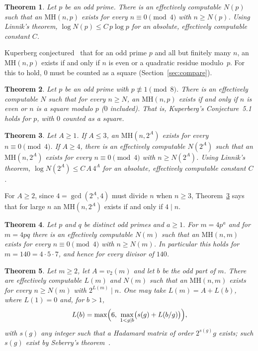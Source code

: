 \documentclass[10pt]{article}
\newtheorem{theorem}{Theorem}
\theoremstyle{remark}
\newcommand{\MH}{\mathrm{MH}}
\begin{document}
\begin{theorem}\label{thm:C}
Let $p$ be an odd prime. There is an effectively computable $N(p)$ such that an $\MH(n,p)$ exists for every $n\equiv0\pmod4$ with $n\ge N(p)$. Using Linnik's theorem, $\log N(p)\le C\,p\log p$ for an absolute, effectively computable constant $C$.
\end{theorem}

Kuperberg conjectured~\cite[Conjecture~5.1]{K} that for an odd prime $p$ and all but finitely many $n$, an $\MH(n,p)$ exists if and only if $n$ is even or a quadratic residue modulo~$p$. For this to hold, $0$ must be counted as a square (Section~\ref{sec:compare}).

\begin{theorem}\label{thm:D}
Let $p$ be an odd prime with $p\not\equiv1\pmod8$. There is an effectively computable $N$ such that for every $n\ge N$, an $\MH(n,p)$ exists if and only if $n$ is even or $n$ is a square modulo $p$ ($0$ included). That is, Kuperberg's Conjecture~5.1 holds for $p$, with $0$ counted as a square.
\end{theorem}

\begin{theorem}\label{thm:E}
Let $A\ge1$. If $A\le3$, an $\MH(n,2^A)$ exists for every $n\equiv0\pmod4$. If $A\ge4$, there is an effectively computable $N(2^A)$ such that an $\MH(n,2^A)$ exists for every $n\equiv0\pmod4$ with $n\ge N(2^A)$. Using Linnik's theorem, $\log N(2^A)\le C\,A\,4^A$ for an absolute, effectively computable constant $C$.
\end{theorem}

For $A\ge2$, since $4=\gcd(2^A,4)$ must divide $n$ when $n\ge3$, Theorem~\ref{thm:E} says that for large $n$ an $\MH(n,2^A)$ exists if and only if $4\mid n$.

\begin{theorem}\label{thm:F}
Let $p$ and $q$ be distinct odd primes and $a\ge1$. For $m=4p^a$ and for $m=4pq$ there is an effectively computable $N(m)$ such that an $\MH(n,m)$ exists for every $n\equiv0\pmod4$ with $n\ge N(m)$. In particular this holds for $m=140=4\cdot5\cdot7$, and hence for every divisor of $140$.
\end{theorem}

\begin{theorem}\label{thm:G}
Let $m\ge2$, let $A=v_2(m)$ and let $b$ be the odd part of $m$. There are effectively computable $L(m)$ and $N(m)$ such that an $\MH(n,m)$ exists for every $n\ge N(m)$ with $2^{L(m)}\mid n$. One may take $L(m)=A+L(b)$, where $L(1)=0$ and, for $b>1$,
\[
L(b)=\max\Bigl(6,\ \max_{1<g\mid b}\bigl(s(g)+L(b/g)\bigr)\Bigr),
\]
with $s(g)$ any integer such that a Hadamard matrix of order $2^{s(g)}g$ exists; such $s(g)$ exist by Seberry's theorem~\cite{Se76}.
\end{theorem}
\end{document}
